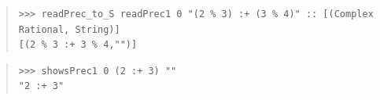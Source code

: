 \begin{haddockdesc}
\item[\begin{tabular}{@{}l}
instance Read1 Complex
\end{tabular}]
{\haddockbegindoc
\begin{quote}
{\haddockverb\begin{verbatim}
>>> readPrec_to_S readPrec1 0 "(2 % 3) :+ (3 % 4)" :: [(Complex Rational, String)]
[(2 % 3 :+ 3 % 4,"")]

\end{verbatim}}
\end{quote}}
\end{haddockdesc}
\begin{haddockdesc}
\item[\begin{tabular}{@{}l}
instance Show1 Complex
\end{tabular}]
{\haddockbegindoc
\begin{quote}
{\haddockverb\begin{verbatim}
>>> showsPrec1 0 (2 :+ 3) ""
"2 :+ 3"

\end{verbatim}}
\end{quote}}
\end{haddockdesc}
